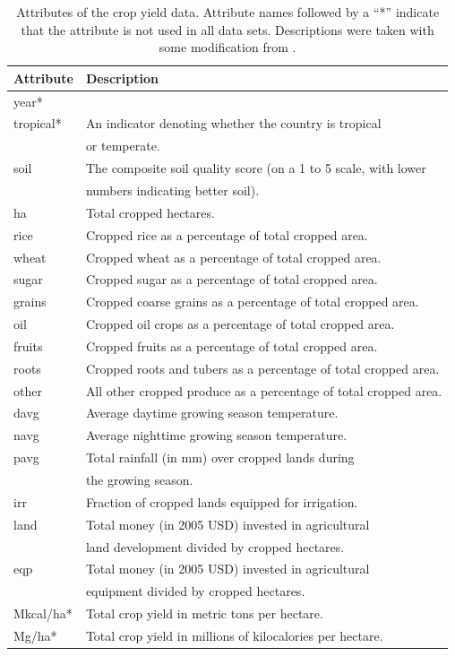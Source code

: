 \documentclass[12pt]{article}
\begin{document}
\begin{table}[h!]
\centering
\begin{tabular}{ll}
\toprule
\textbf{Attribute} & \textbf{Description} \\
\midrule
year* & \\
tropical* & An indicator denoting whether the country is tropical \\
& or temperate. \\
soil & The composite soil quality score (on a 1 to 5 scale, with lower \\
& numbers indicating better soil). \\
ha & Total cropped hectares. \\
rice & Cropped rice as a percentage of total cropped area. \\
wheat & Cropped wheat as a percentage of total cropped area.\\
sugar & Cropped sugar as a percentage of total cropped area.\\
grains & Cropped coarse grains as a percentage of total cropped area.\\
oil & Cropped oil crops as a percentage of total cropped area.\\
fruits & Cropped fruits as a percentage of total cropped area.\\
roots & Cropped roots and tubers as a percentage of total cropped area.\\
other & All other cropped produce as a percentage of total cropped area. \\
davg & Average daytime growing season temperature. \\
navg & Average nighttime growing season temperature. \\
pavg & Total rainfall (in mm) over cropped lands during \\
& the growing season. \\
irr & Fraction of cropped lands equipped for irrigation. \\
land & Total money (in 2005 USD) invested in agricultural \\
& land development divided by cropped hectares. \\
eqp & Total money (in 2005 USD) invested in agricultural \\
&  equipment divided by cropped hectares. \\
Mkcal/ha* & Total crop yield in metric tons per hectare. \\
Mg/ha* & Total crop yield in millions of kilocalories per hectare. \\
\bottomrule 
\end{tabular}
\caption{Attributes of the crop yield data. Attribute names followed by a ``*'' indicate that the attribute is not used in all data sets. Descriptions were taken with some modification from \cite{nelson_measuring_2016}.}
\label{crop_attributes}
\end{table}
\end{document}
